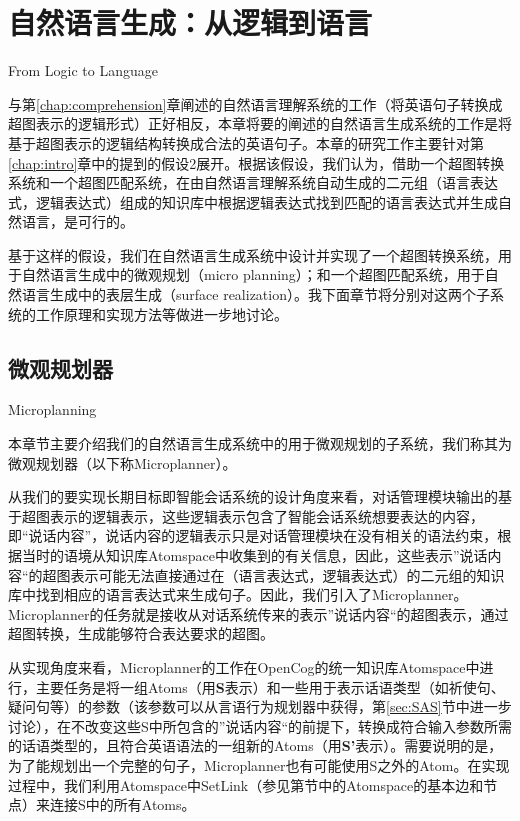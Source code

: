 \chapter{自然语言生成：从逻辑到语言}{From Logic to Language}
\label{chap:generation}

与第\ref{chap:comprehension}章阐述的自然语言理解系统的工作（将英语句子转换成超图表示的逻辑形式）正好相反，本章将要的阐述的自然语言生成系统的工作是将基于超图表示的逻辑结构转换成合法的英语句子。本章的研究工作主要针对第\ref{chap:intro}章中的提到的假设2展开。根据该假设，我们认为，借助一个超图转换系统和一个超图匹配系统，在由自然语言理解系统自动生成的二元组（语言表达式，逻辑表达式）组成的知识库中根据逻辑表达式找到匹配的语言表达式并生成自然语言，是可行的。

基于这样的假设，我们在自然语言生成系统中设计并实现了一个超图转换系统，用于自然语言生成中的微观规划（micro planning）；和一个超图匹配系统，用于自然语言生成中的表层生成（surface realization）。我下面章节将分别对这两个子系统的工作原理和实现方法等做进一步地讨论。

\section{微观规划器}{Microplanning}

本章节主要介绍我们的自然语言生成系统中的用于微观规划的子系统，我们称其为微观规划器（以下称Microplanner）。

从我们的要实现长期目标即智能会话系统的设计角度来看，对话管理模块输出的基于超图表示的逻辑表示，这些逻辑表示包含了智能会话系统想要表达的内容，即“说话内容”，说话内容的逻辑表示只是对话管理模块在没有相关的语法约束，根据当时的语境从知识库Atomspace中收集到的有关信息，因此，这些表示”说话内容“的超图表示可能无法直接通过在（语言表达式，逻辑表达式）的二元组的知识库中找到相应的语言表达式来生成句子。因此，我们引入了Microplanner。Microplanner的任务就是接收从对话系统传来的表示”说话内容“的超图表示，通过超图转换，生成能够符合表达要求的超图。

从实现角度来看，Microplanner的工作在OpenCog的统一知识库Atomspace中进行，主要任务是将一组Atoms（用{\bf S}表示）和一些用于表示话语类型（如祈使句、疑问句等）的参数（该参数可以从言语行为规划器中获得，第\ref{sec:SAS}节中进一步讨论），在不改变这些S中所包含的”说话内容“的前提下，转换成符合输入参数所需的话语类型的，且符合英语语法的一组新的Atoms（用{\bf S'}表示）。需要说明的是，为了能规划出一个完整的句子，Microplanner也有可能使用S之外的Atom。在实现过程中，我们利用Atomspace中SetLink（参见第\label{sec:atoms}节中的Atomspace的基本边和节点）来连接S中的所有Atoms。

